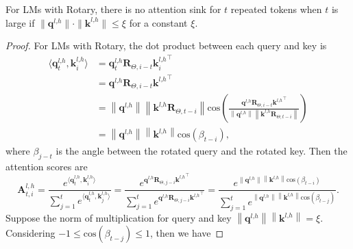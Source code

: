 \begin{proposition}\label{prop4}
    For LMs with Rotary, there is no attention sink for $t$ repeated tokens when $t$ is large if $\|\boldsymbol{q}^{l\textrm{,}h}\|\cdot\|\boldsymbol{k}^{l\textrm{,}h}\|\leq \xi$ for a constant $\xi$.
\end{proposition}
\begin{proof}
    For LMs with Rotary, the dot product between each query and key is 
\begin{align}
\langle\boldsymbol{q}_t^{l\textrm{,}h}\textrm{,}\,\boldsymbol{k}_i^{l\textrm{,}h}\rangle&=\boldsymbol{q}_t^{l\textrm{,}h}\boldsymbol{R}_{\Theta\textrm{,}\,i-t}{\boldsymbol{k}_i^{l\textrm{,}h}}^\top\\
&=\boldsymbol{q}^{l\textrm{,}h}\boldsymbol{R}_{\Theta\textrm{,}\,i-t}{\boldsymbol{k}^{l\textrm{,}h}}^\top\\
&=\left\|\boldsymbol{q}^{l\textrm{,}h}\right\|\left\|\boldsymbol{k}^{l\textrm{,}h}\boldsymbol{R}_{\Theta\textrm{,}\,t-i}\right\|\textrm{cos}\left(\frac{\boldsymbol{q}^{l\textrm{,}h}\boldsymbol{R}_{\Theta\textrm{,}\,i-t}{\boldsymbol{k}^{l\textrm{,}h}}^\top}{\left\|\boldsymbol{q}^{l\textrm{,}h}\right\|\left\|\boldsymbol{k}^{l\textrm{,}h}\boldsymbol{R}_{\Theta\textrm{,}\,t-i}\right\|}\right)\\
&=\left\|\boldsymbol{q}^{l\textrm{,}h}\right\|\left\|\boldsymbol{k}^{l\textrm{,}h}\right\|\textrm{cos}(\beta_{t-i})\textrm{,}
\end{align}
where $\beta_{j-t}$ is the angle between the rotated query and the rotated key. Then the attention scores are
\begin{equation}
\boldsymbol{A}_{t\textrm{,}\,i}^{l\textrm{,}\,h}=\frac{e^{\langle\boldsymbol{q}_t^{l\textrm{,}h}\textrm{,}\,\boldsymbol{k}_i^{l\textrm{,}h}\rangle}}{\sum_{j=1}^t e^{\langle\boldsymbol{q}_t^{l\textrm{,}h}\textrm{,}\,\boldsymbol{k}_j^{l\textrm{,}h}\rangle}}=\frac{e^{\boldsymbol{q}^{l\textrm{,}h}\boldsymbol{R}_{\Theta\textrm{,}\,j-i}{\boldsymbol{k}^{l\textrm{,}h}}^\top}}{\sum_{j=1}^te^{\boldsymbol{q}^{l\textrm{,}h}\boldsymbol{R}_{\Theta\textrm{,}\,j-i}{\boldsymbol{k}^{l\textrm{,}h}}^\top}}=\frac{e^{\left\|\boldsymbol{q}^{l\textrm{,}h}\right\|\left\|\boldsymbol{k}^{l\textrm{,}h}\right\|\textrm{cos}(\beta_{t-i})}}{\sum_{j=1}^te^{\left\|\boldsymbol{q}^{l\textrm{,}h}\right\|\left\|\boldsymbol{k}^{l\textrm{,}h}\right\|\textrm{cos}(\beta_{t-j})}}\textrm{.}
\end{equation}
Suppose the norm of multiplication for query and key  $\left\|\boldsymbol{q}^{l\textrm{,}h}\right\|\left\|\boldsymbol{k}^{l\textrm{,}h}\right\|=\xi$. Considering $-1\leq\textrm{cos}(\beta_{t-j})\leq 1$, then we have

\end{proof}
